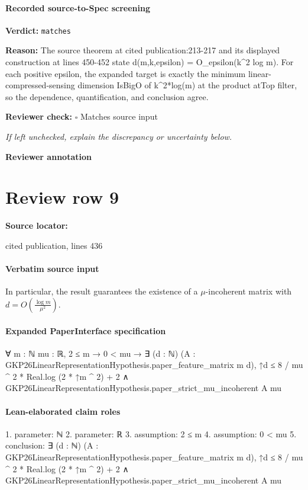 \documentclass[10pt]{article}
\newcommand{\reviewerbox}{%
  \par\noindent\fbox{\parbox{0.96\linewidth}{\rule{0pt}{0.38in}}}\par
}
\newcommand{\reviewmatch}[1]{%
  \par\noindent\textbf{Reviewer check:} $\square$\; #1\par
  \noindent\emph{If left unchecked, explain the discrepancy or uncertainty below.}\par
}
\begin{document}
\paragraph{Recorded source-to-Spec screening}
\textbf{Verdict:} \texttt{matches}
\\
{\raggedright
\textbf{Reason:} The source theorem at cited publication:\allowbreak{}213-\allowbreak{}217 and its displayed construction at lines 450-\allowbreak{}452 state d(m,k,epsilon) = O\_\allowbreak{}epsilon(k\textasciicircum{}2 log m).\allowbreak{} For each positive epsilon, the expanded target is exactly the minimum linear-\allowbreak{}compressed-\allowbreak{}sensing dimension IsBigO of k\textasciicircum{}2*log(m) at the product atTop filter, so the dependence, quantification, and conclusion agree.\allowbreak{}
\par}
\reviewmatch{Matches source input}
\noindent\textbf{Reviewer annotation}\par
\reviewerbox
\clearpage
\hypertarget{source-claim-b773a309f631cb95}{}
\section*{Review row 9}
\textbf{Source locator:} {\footnotesize\raggedright cited publication, lines 436\par}
\paragraph{Verbatim source input}
\begin{ReviewVerbatim}
In particular, the result guarantees the existence of a $\mu$-incoherent matrix with $d = O(\frac{\log m}{\mu^2}).$
\end{ReviewVerbatim}



\paragraph{Expanded PaperInterface specification}
\begin{ReviewVerbatim}
∀ {m : ℕ} {mu : ℝ},
  2 ≤ m →
    0 < mu →
      ∃ (d : ℕ) (A : GKP26LinearRepresentationHypothesis.paper_feature_matrix m d),
        ↑d ≤ 8 / mu ^ 2 * Real.log (2 * ↑m ^ 2) + 2 ∧
          GKP26LinearRepresentationHypothesis.paper_strict_mu_incoherent A mu
\end{ReviewVerbatim}

\paragraph{Lean-elaborated claim roles}\begin{ReviewVerbatim}
1. parameter: ℕ
2. parameter: ℝ
3. assumption: 2 ≤ m
4. assumption: 0 < mu
5. conclusion: ∃ (d : ℕ) (A : GKP26LinearRepresentationHypothesis.paper_feature_matrix m d),
  ↑d ≤ 8 / mu ^ 2 * Real.log (2 * ↑m ^ 2) + 2 ∧ GKP26LinearRepresentationHypothesis.paper_strict_mu_incoherent A mu
\end{ReviewVerbatim}
\end{document}
